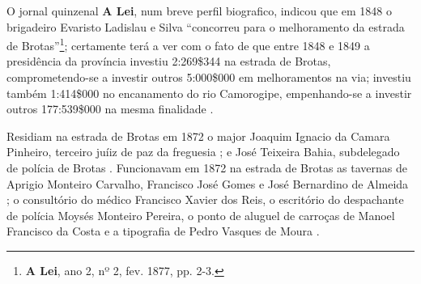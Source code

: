 
O jornal quinzenal \textbf{A Lei}, num breve perfil biografico, indicou que em 1848 o brigadeiro Evaristo Ladislau e Silva ``concorreu para o melhoramento da estrada de Brotas''\footnote{\textbf{A Lei}, ano 2, nº 2, fev. 1877, pp. 2-3.}; certamente terá a ver com o fato de que entre 1848 e 1849 a presidência da província investiu 2:269\$344 na estrada de Brotas, comprometendo-se a investir outros 5:000\$000 em melhoramentos na via; investiu também 1:414\$000 no encanamento do rio Camorogipe, empenhando-se a investir outros 177:539\$000 na mesma finalidade \cite{bahia_rpe_1849}.

Residiam na estrada de Brotas em 1872 o major Joaquim Ignacio da Camara Pinheiro, terceiro juíiz de paz da freguesia \cite[segunda~parte, p.~91]{pimenta_almanak_1872}; e José Teixeira Bahia, subdelegado de polícia de Brotas \cite[segunda~parte, pp.~132]{pimenta_almanak_1872}. Funcionavam em 1872 na estrada de Brotas as tavernas de Aprigio Monteiro Carvalho, Francisco José Gomes e José Bernardino de Almeida \cite[terceira~parte, pp.~39, 42, 43]{pimenta_almanak_1872}; o consultório do médico Francisco Xavier dos Reis, o escritório do despachante de polícia Moysés Monteiro Pereira, o ponto de aluguel de carroças de Manoel Francisco da Costa e a tipografia de Pedro Vasques de Moura \cite[quarta~parte, pp.~4, 10, 20, 38]{pimenta_almanak_1872}.

